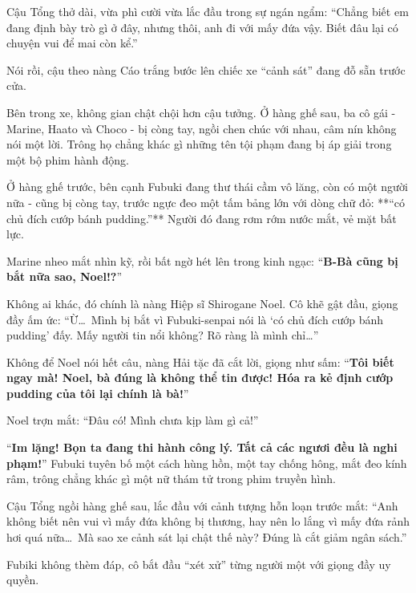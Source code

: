 \documentclass[../main.tex]{subfiles}
\begin{document}
\omk



Cậu Tổng thở dài, vừa phì cười vừa lắc đầu trong sự ngán ngẩm: ``Chẳng biết em đang định bày trò gì ở đây, nhưng thôi, anh đi với mấy đứa vậy. Biết đâu lại có chuyện vui để mai còn kể.''

Nói rồi, cậu theo nàng Cáo trắng bước lên chiếc xe ``cảnh sát'' đang đỗ sẵn trước cửa.


Bên trong xe, không gian chật chội hơn cậu tưởng. Ở hàng ghế sau, ba cô gái - Marine, Haato và Choco - bị còng tay, ngồi chen chúc với nhau, câm nín không nói một lời. Trông họ chẳng khác gì những tên tội phạm đang bị áp giải trong một bộ phim hành động.

Ở hàng ghế trước, bên cạnh Fubuki đang thư thái cầm vô lăng, còn có một người nữa - cũng bị còng tay, trước ngực đeo một tấm bảng lớn với dòng chữ đỏ: **``có chủ đích cướp bánh pudding.''** Người đó đang rơm rớm nước mắt, vẻ mặt bất lực.

Marine nheo mắt nhìn kỹ, rồi bất ngờ hét lên trong kinh ngạc: ``\textbf{B-Bà cũng bị bắt nữa sao, Noel!?}''

Không ai khác, đó chính là nàng Hiệp sĩ Shirogane Noel. Cô khẽ gật đầu, giọng đầy ấm ức: ``Ừ\dots\ Mình bị bắt vì Fubuki-senpai nói là `có chủ đích cướp bánh pudding' đấy. Mấy người tin nổi không? Rõ ràng là mình chỉ\dots''

Không để Noel nói hết câu, nàng Hải tặc đã cắt lời, giọng như sấm: ``\textbf{Tôi biết ngay mà! Noel, bà đúng là không thể tin được! Hóa ra kẻ định cướp pudding của tôi lại chính là bà!}''

Noel trợn mắt: ``Đâu có! Mình chưa kịp làm gì cả!''

``\textbf{Im lặng! Bọn ta đang thi hành công lý. Tất cả các ngươi đều là nghi phạm!}'' Fubuki tuyên bố một cách hùng hồn, một tay chống hông, mắt đeo kính râm, trông chẳng khác gì một nữ thám tử trong phim truyền hình.

Cậu Tổng ngồi hàng ghế sau, lắc đầu với cảnh tượng hỗn loạn trước mắt: ``Anh không biết nên vui vì mấy đứa không bị thương, hay nên lo lắng vì mấy đứa rảnh hơi quá nữa\dots\ Mà sao xe cảnh sát lại chật thế này? Đúng là cắt giảm ngân sách.''

Fubiki không thèm đáp, cô bắt đầu ``xét xử'' từng người một với giọng đầy uy quyền.
\end{document}
